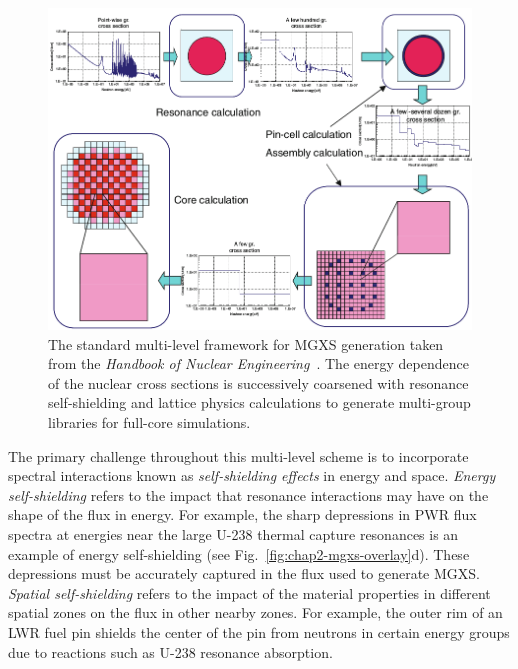 \begin{figure}[h!]
  \centering
  \includegraphics[width=0.9\linewidth]{figures/mgxs/nuke-handbook-mgxs-process}
\caption[Standard multi-level framework for MGXS generation]{The standard multi-level framework for \ac{MGXS} generation taken from the \textit{Handbook of Nuclear Engineering}~\cite{cacuci2010handbook}. The energy dependence of the nuclear cross sections is successively coarsened with resonance self-shielding and lattice physics calculations to generate multi-group libraries for full-core simulations.}
\label{fig:chap2-mgxs-process}
\end{figure}


The primary challenge throughout this multi-level scheme is to incorporate spectral interactions known as \textit{self-shielding effects} in energy and space. \textit{Energy self-shielding} refers to the impact that resonance interactions may have on the shape of the flux in energy. For example, the sharp depressions in \ac{PWR} flux spectra at energies near the large U-238 thermal capture resonances is an example of energy self-shielding (see Fig.~\ref{fig:chap2-mgxs-overlay}d). These depressions must be accurately captured in the flux used to generate \ac{MGXS}. \textit{Spatial self-shielding} refers to the impact of the material properties in different spatial zones on the flux in other nearby zones. For example, the outer rim of an \ac{LWR} fuel pin shields the center of the pin from neutrons in certain energy groups due to reactions such as U-238 resonance absorption.


